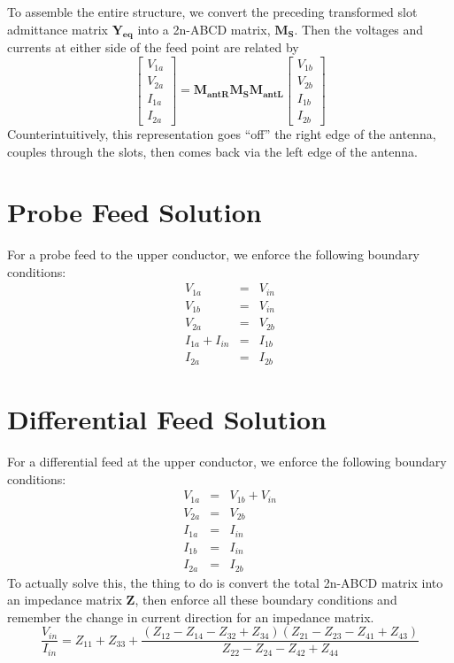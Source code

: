 \documentclass{article}
\begin{document}
To assemble the entire structure, we convert the preceding transformed slot admittance matrix $\mathbf{Y_{eq}}$ into a 2n-ABCD matrix, $\mathbf{M_{S}}$.  Then the voltages and currents at either side of the feed point are related by
\begin{equation}
\begin{bmatrix}V_{1a}\\V_{2a}\\I_{1a}\\I_{2a}\end{bmatrix} = \mathbf{M_{antR} M_S M_{antL}} \begin{bmatrix}V_{1b}\\V_{2b}\\I_{1b}\\I_{2b}\end{bmatrix}
\end{equation}
Counterintuitively, this representation goes ``off'' the right edge of the antenna, couples through the slots, then comes back via the left edge of the antenna.

\section{Probe Feed Solution}
For a probe feed to the upper conductor, we enforce the following boundary conditions:
\begin{eqnarray}
V_{1a} &=& V_{in}\\
V_{1b} &=& V_{in}\\
V_{2a}&=&V_{2b}\\
I_{1a} + I_{in} &= &I_{1b}\\
I_{2a} &=& I_{2b}
\end{eqnarray}
\section{Differential Feed Solution}
For a differential feed at the upper conductor, we enforce the following boundary conditions:
\begin{eqnarray}
V_{1a} &=& V_{1b}+V_{in}\\
V_{2a}&=&V_{2b}\\
I_{1a} &= &I_{in}\\
I_{1b} &=& I_{in}\\
I_{2a} &=& I_{2b}
\end{eqnarray}
To actually solve this, the thing to do is convert the total 2n-ABCD matrix into an impedance matrix $\mathbf{Z}$, then enforce all these boundary conditions and remember the change in current direction for an impedance matrix.
\begin{equation}
\frac{V_{in}}{I_{in}} = Z_{11}+Z_{33}+\frac{(Z_{12}-Z_{14}-Z_{32}+Z_{34})(Z_{21}-Z_{23}-Z_{41}+Z_{43})}{Z_{22}-Z_{24}-Z_{42}+Z_{44}}
\end{equation}
\end{document}
